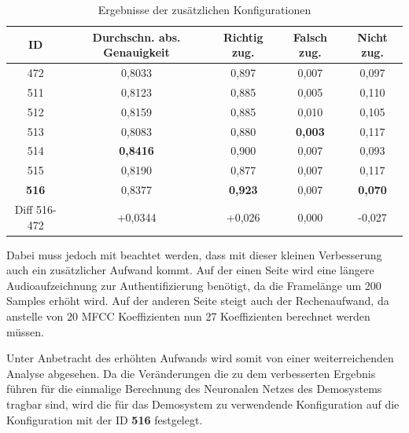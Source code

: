 \begin{table}[H]
    \centering
    \begin{tabular}{c|c|c|c|c}
        ID            & Durchschn. abs. Genauigkeit & Richtig zug.   & Falsch zug.    & Nicht zug.     \\ \hline
        472           & 0,8033                      & 0,897          & 0,007          & 0,097          \\ \hline \hline
        511           & 0,8123                      & 0,885          & 0,005          & 0,110          \\ \hline
        512           & 0,8159                      & 0,885          & 0,010          & 0,105          \\ \hline
        513           & 0,8083                      & 0,880          & \textbf{0,003} & 0,117          \\ \hline
        514           & \textbf{0,8416}             & 0,900          & 0,007          & 0,093          \\ \hline
        515           & 0,8190                      & 0,877          & 0,007          & 0,117          \\ \hline
        \textbf{516}  & 0,8377                      & \textbf{0,923} & 0,007          & \textbf{0,070} \\ \hline \hline
        Diff 516-472  & +0,0344                     & +0,026         & 0,000          & -0,027
    \end{tabular}
    \caption{Ergebnisse der zusätzlichen Konfigurationen}
    \label{table:resultAdditionalKonfigs}
\end{table}
Dabei muss jedoch mit beachtet werden, dass mit dieser kleinen Verbesserung auch ein zusätzlicher Aufwand kommt.
Auf der einen Seite wird eine längere Audioaufzeichnung zur Authentifizierung benötigt, da die Framelänge um 200 Samples erhöht wird.
Auf der anderen Seite steigt auch der Rechenaufwand, da anstelle von 20 \ac{MFCC} Koeffizienten nun 27 Koeffizienten berechnet werden müssen.

Unter Anbetracht des erhöhten Aufwands wird somit von einer weiterreichenden Analyse abgesehen.
Da die Veränderungen die zu dem verbesserten Ergebnis führen für die einmalige Berechnung des Neuronalen Netzes des Demosystems tragbar sind, wird die für das Demosystem zu verwendende Konfiguration auf die Konfiguration mit der ID \textbf{516} festgelegt.
